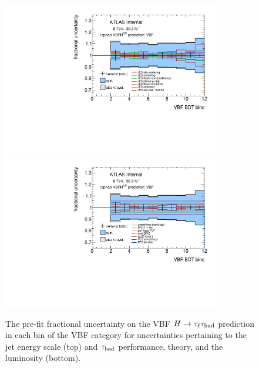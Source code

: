 \begin{figure}[tp]
  \includegraphics[width=0.85\textwidth]{figures/uncertainties/uncertainties_lephad_paper14_8TeV_VBFH125_JES_VBF}
  \includegraphics[width=0.85\textwidth]{figures/uncertainties/uncertainties_lephad_paper14_8TeV_VBFH125_other_VBF}
  \caption{The pre-fit fractional uncertainty on the VBF $H\rightarrow\tau_\ell\tau_\text{had}$ prediction in each bin of the VBF category for uncertainties pertaining to the jet energy scale (top) and $\tau_\text{had}$ performance, theory, and the luminosity (bottom).}
  \label{fig:backgrounds-uncertainties-vbf}
\end{figure}


